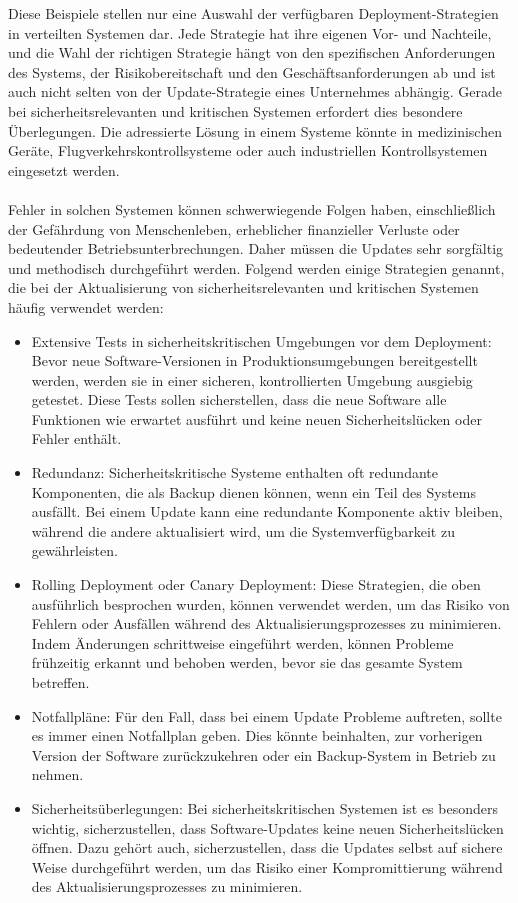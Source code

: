 \documentclass[../vs-script-first-v01.tex]{subfiles}
\begin{document}
Diese Beispiele stellen nur eine Auswahl der verfügbaren Deployment-Strategien in verteilten Systemen dar. Jede Strategie hat ihre eigenen Vor- und Nachteile, und die Wahl der richtigen Strategie hängt von den spezifischen Anforderungen des Systems, der Risikobereitschaft und den Geschäftsanforderungen ab und ist auch nicht selten von der Update-Strategie eines Unternehmes abhängig. Gerade bei sicherheitsrelevanten und kritischen Systemen erfordert dies besondere Überlegungen. 
Die adressierte Lösung in einem Systeme könnte in medizinischen Geräte, Flugverkehrskontrollsysteme oder auch industriellen Kontrollsystemen eingesetzt werden. 
\\\\
Fehler in solchen Systemen können schwerwiegende Folgen haben, einschließlich der Gefährdung von Menschenleben, erheblicher finanzieller Verluste oder bedeutender Betriebsunterbrechungen. Daher müssen die Updates sehr sorgfältig und methodisch durchgeführt werden.
Folgend werden einige Strategien genannt, die bei der Aktualisierung von sicherheitsrelevanten und kritischen Systemen häufig verwendet werden:
\begin{itemize} 
\item Extensive Tests in sicherheitskritischen Umgebungen vor dem Deployment: Bevor neue Software-Versionen in Produktionsumgebungen bereitgestellt werden, werden sie in einer sicheren, kontrollierten Umgebung ausgiebig getestet. Diese Tests sollen sicherstellen, dass die neue Software alle Funktionen wie erwartet ausführt und keine neuen Sicherheitslücken oder Fehler enthält.

\item Redundanz: Sicherheitskritische Systeme enthalten oft redundante Komponenten, die als Backup dienen können, wenn ein Teil des Systems ausfällt. Bei einem Update kann eine redundante Komponente aktiv bleiben, während die andere aktualisiert wird, um die Systemverfügbarkeit zu gewährleisten.

\item Rolling Deployment oder Canary Deployment: Diese Strategien, die oben ausführlich besprochen wurden, können verwendet werden, um das Risiko von Fehlern oder Ausfällen während des Aktualisierungsprozesses zu minimieren. Indem Änderungen schrittweise eingeführt werden, können Probleme frühzeitig erkannt und behoben werden, bevor sie das gesamte System betreffen.

\item  Notfallpläne: Für den Fall, dass bei einem Update Probleme auftreten, sollte es immer einen Notfallplan geben. Dies könnte beinhalten, zur vorherigen Version der Software zurückzukehren oder ein Backup-System in Betrieb zu nehmen.

\item Sicherheitsüberlegungen: Bei sicherheitskritischen Systemen ist es besonders wichtig, sicherzustellen, dass Software-Updates keine neuen Sicherheitslücken öffnen. Dazu gehört auch, sicherzustellen, dass die Updates selbst auf sichere Weise durchgeführt werden, um das Risiko einer Kompromittierung während des Aktualisierungsprozesses zu minimieren.
\end{itemize} 
\end{document}
